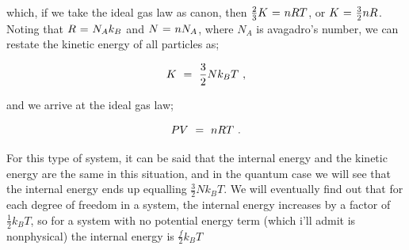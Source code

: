\documentclass{article}
\begin{document}
which, if we take the ideal gas law as canon, then \begin{math} \frac{2}{3} K \hspace{0.025cm} = \hspace{0.025cm} n R T \end{math}, or \begin{math} K \hspace{0.025cm} = \hspace{0.025cm} \frac{3}{2} n R \end{math}. Noting that \begin{math} R \hspace{0.025cm} = \hspace{0.025cm} N_A k_B  \end{math} and \begin{math} N \hspace{0.025cm} = \hspace{0.025cm} n N_A \end{math}, where \begin{math} N_A \end{math} is avagadro's number, we can restate the kinetic energy of all particles as;

\begin{equation} \label{eq:256}
K \hspace{0.125cm} = \hspace{0.125cm} \frac{3}{2} N k_B T \hspace{0.125cm} ,
\end{equation}

and we arrive at the ideal gas law;

\begin{equation} \label{eq:256}
P V \hspace{0.125cm} = \hspace{0.125cm} n R T \hspace{0.125cm} .
\end{equation}

For this type of system, it can be said that the internal energy and the kinetic energy are the same in this situation, and in the quantum case we will see that the internal energy ends up equalling \begin{math} \frac{3}{2} N k_B T \end{math}. We will eventually find out that for each degree of freedom in a system, the internal energy increases by a factor of \begin{math} \frac{1}{2} k_B T \end{math}, so for a system with no potential energy term (which i'll admit is nonphysical) the internal energy is \begin{math} \frac{f}{2} k_B T \end{math}
\end{document}
